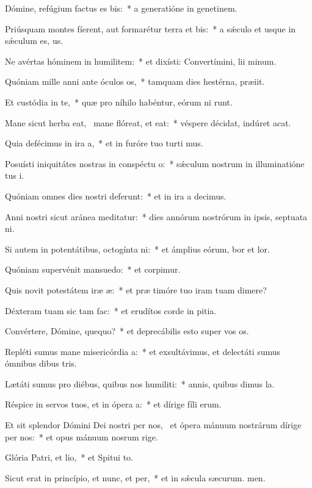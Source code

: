 \item Dómine, refúgium factus es bis:~* a generatióne in genetinem.
\item Priúsquam montes fíerent, aut formarétur terra et bis:~* a sǽculo et usque in sǽculum  es, us.
\item Ne avértas hóminem in humilitem:~* et dixísti: Convertímini, lii minum.
\item Quóniam mille anni ante óculos os,~* tamquam dies hestérna,  præiit.
\item Et custódia in te,~* quæ pro níhilo habéntur, eórum ni runt.
\item Mane sicut herba eat,~\pscross{} mane flóreat, et eat:~* véspere décidat, indúret  acat.
\item Quia defécimus in ira a,~* et in furóre tuo turti mus.
\item Posuísti iniquitátes nostras in conspéctu o:~* sǽculum nostrum in illuminatióne tus i.
\item Quóniam omnes dies nostri deferunt:~* et in ira a decimus.
\item Anni nostri sicut aránea meditatur:~* dies annórum nostrórum in ipsis, septuata ni.
\item Si autem in potentátibus, octogínta ni:~* et ámplius eórum, bor et lor.
\item Quóniam supervénit mansuedo:~* et corpimur.
\item Quis novit potestátem iræ æ:~* et præ timóre tuo iram tuam dimere?
\item Déxteram tuam sic tam fac:~* et erudítos corde in pitia.
\item Convértere, Dómine, quequo?~* et deprecábilis esto super vos os.
\item Repléti sumus mane misericórdia a:~* et exsultávimus, et delectáti sumus ómnibus dibus tris.
\item Lætáti sumus pro diébus, quibus nos humiliti:~* annis, quibus dimus la.
\item Réspice in servos tuos, et in ópera a:~* et dírige fíli erum.
\item Et sit splendor Dómini Dei nostri per nos,~\pscross{} et ópera mánuum nostrárum dírige per nos:~* et opus mánuum nosrum rige.
\item Glória Patri, et lio,~* et Spitui to.
\item Sicut erat in princípio, et nunc, et per,~* et in sǽcula sæcurum. men.
